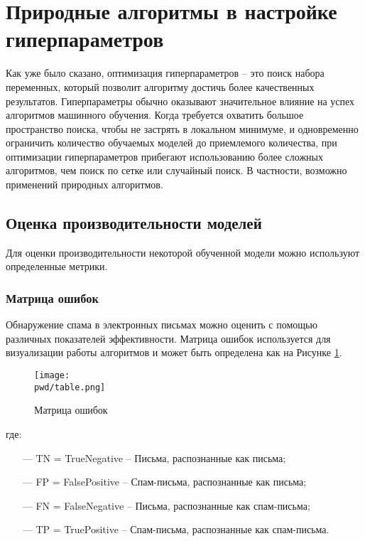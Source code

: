 \section{Природные алгоритмы в настройке гиперпараметров}\label{Section:Performance}

Как уже было сказано, оптимизация гиперпараметров -- это поиск набора переменных, который позволит
алгоритму достичь более качественных результатов. Гиперпараметры обычно оказывают
значительное влияние на успех алгоритмов машинного обучения.
Когда требуется охватить большое пространство поиска, чтобы не застрять
в локальном минимуме, и одновременно ограничить количество обучаемых
моделей до приемлемого количества, при оптимизации гиперпараметров прибегают
использованию более сложных алгоритмов, чем поиск по сетке или случайный поиск.
В частности, возможно применений природных алгоритмов.

\subsection{Оценка производительности моделей}\label{Scorer}

Для оценки производительности некоторой обученной модели можно используют определенные метрики.

\subsubsection{Матрица ошибок}

Обнаружение спама в электронных письмах можно оценить с помощью
различных показателей эффективности. Матрица ошибок используется для
визуализации работы алгоритмов и может быть определена как на Рисунке \ref{CM}.

\begin{figure}[H]
    \centering
    \texttt{[image: \\pwd/table.png]}
    \caption{Матрица ошибок}
    \label{CM}
\end{figure}
где:

\begin{itemize}
    \item[—] TN = TrueNegative -- Письма, распознанные как письма;
    \item[—] FP = FalsePositive -- Спам-письма, распознанные как письма;
    \item[—] FN = FalseNegative -- Письма, распознанные как спам-письма;
    \item[—] TP = TruePositive -- Спам-письма, распознанные как спам-письма.
\end{itemize}


